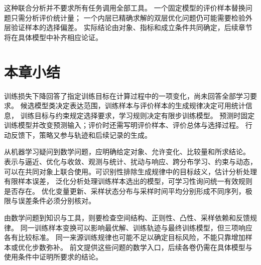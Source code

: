 这种联合分析并不要求所有任务调用全部工具。
一个固定模型的评价样本替换问题只需分析评价统计量；
一个内层已精确求解的双层优化问题仍可能需要检验外层验证样本的选择偏差。
实际结论由对象、指标和成立条件共同确定，后续章节将在具体模型中补齐相应论证。

\FloatBarrier
\section{本章小结}
\label{sec:future-summary}

训练损失下降回答了指定训练目标在计算过程中的一项变化，尚未回答全部学习要求。
候选模型类决定表达范围，训练样本与评价样本的生成规律决定可用统计信息，
训练目标与约束规定选择要求，学习规则决定有限步训练模型。
预测时固定训练模型并改变预测输入；评价时还需写明评价样本、评价总体与选择过程。
行动反馈下，策略又参与轨迹和后续记录的生成。

从机器学习疑问到数学问题，应明确给定对象、允许变化、比较量和所求结论。
表示与逼近、优化与收敛、观测与统计、扰动与响应、跨分布学习、约束与动态，
可以在共同对象上联合使用。可识别性排除生成规律中的目标歧义，估计分析处理有限样本误差，
泛化分析处理训练样本选出的模型，可学习性询问统一有效规则是否存在。
优化变量更新、采样状态分布与采样时间平均分别形成不同序列，极限与误差条件必须分别核对。

由数学问题到知识与工具，则要检查空间结构、正则性、凸性、采样依赖和反馈规律。
同一训练样本变换可以影响最优解、训练轨迹与最终训练模型，但三项响应各有比较标准。
同一来源训练规律也可能不足以确定目标风险，不能只靠增加样本或优化步数弥补。
前文提供这些问题的数学入口，后续各卷仍需在具体模型与使用条件中证明所要求的结论。
